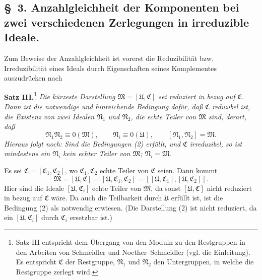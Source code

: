 \documentclass[11pt]{article}
\newcommand{\ideal}[1]{\mathfrak{#1}}
\begin{document}
\subsection*{\S~3. Anzahlgleichheit der Komponenten bei zwei verschiedenen Zerlegungen in irreduzible Ideale.}

Zum Beweise der Anzahlgleichheit ist vorerst die Reduzibilität bzw. Irreduzibilität eines Ideals durch Eigenschaften seines Komplementes auszudrücken nach

\textbf{Satz III.}\footnote{Satz III entspricht dem Übergang von den Moduln zu den Restgruppen in den Arbeiten von Schmeidler und Noether--Schmeidler (vgl. die Einleitung). Es entspricht $\ideal C$ der Restgruppe, $\ideal N_1$ und $\ideal N_2$ den Untergruppen, in welche die Restgruppe zerlegt wird.} \emph{Die kürzeste Darstellung $\ideal M=[\ideal U,\ideal C]$ sei reduziert in bezug auf $\ideal C$. Dann ist die notwendige und hinreichende Bedingung dafür, daß $\ideal C$ reduzibel ist, die Existenz von zwei Idealen $\ideal N_1$ und $\ideal N_2$, die echte Teiler von $\ideal M$ sind, derart, daß}
\begin{equation}
 \ideal N_1\ideal N_2\equiv0(\ideal M),\qquad
 \ideal N_i\equiv0(\ideal U),\qquad
 [\ideal N_1,\ideal N_2]=\ideal M.
\tag{2}
\end{equation}
\emph{Hieraus folgt noch: Sind die Bedingungen (2) erfüllt, und $\ideal C$ irreduzibel, so ist mindestens ein $\ideal N_i$ kein echter Teiler von $\ideal M$; $\ideal N_i=\ideal M$.}

Es sei $\ideal C=[\ideal C_1,\ideal C_2]$, wo $\ideal C_1,\ideal C_2$ echte Teiler von $\ideal C$ seien. Dann kommt
\[
 \ideal M=[\ideal U,\ideal C]=[\ideal U,\ideal C_1,\ideal C_2]
       =[[\ideal U,\ideal C_1],[\ideal U,\ideal C_2]].
\]
Hier sind die Ideale $[\ideal U,\ideal C_i]$ echte Teiler von $\ideal M$, da sonst $[\ideal U,\ideal C]$ nicht reduziert in bezug auf $\ideal C$ wäre. Da auch die Teilbarkeit durch $\ideal U$ erfüllt ist, ist die Bedingung (2) als notwendig erwiesen. (Die Darstellung (2) ist nicht reduziert, da ein $[\ideal U,\ideal C_i]$ durch $\ideal C_i$ ersetzbar ist.)
\end{document}
